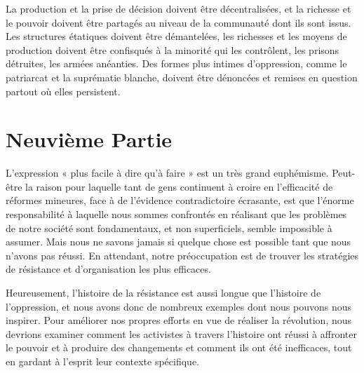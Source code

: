 La production et la prise de décision doivent être décentralisées, et la richesse et le pouvoir doivent être partagés au niveau de la communauté dont ils sont issus. Les structures étatiques doivent être démantelées, les richesses et les moyens de production doivent être confisqués à la minorité qui les contrôlent, les prisons détruites, les armées anéanties. Des formes plus intimes d'oppression, comme le patriarcat et la suprématie blanche, doivent être dénoncées et remises en question partout où elles persistent.

\chapter*{\textbf{Neuvième Partie}}\hypertarget{neuvime-partie}{}\label{neuvime-partie}

L'expression « plus facile à dire qu'à faire » est un très grand euphémisme. Peut-être la raison pour laquelle tant de gens continuent à croire en l'efficacité de réformes mineures, face à de l’évidence contradictoire écrasante, est que l'énorme responsabilité à laquelle nous sommes confrontés en réalisant que les problèmes de notre société sont fondamentaux, et non superficiels, semble impossible à assumer. Mais nous ne savons jamais si quelque chose est possible tant que nous n'avons pas réussi. En attendant, notre préoccupation est de trouver les stratégies de résistance et d'organisation les plus efficaces.

Heureusement, l'histoire de la résistance est aussi longue que l'histoire de l'oppression, et nous avons donc de nombreux exemples dont nous pouvons nous inspirer. Pour améliorer nos propres efforts en vue de réaliser la révolution, nous devrions examiner comment les activistes à travers l'histoire ont réussi à affronter le pouvoir et à produire des changements et comment ils ont été inefficaces, tout en gardant à l'esprit leur contexte spécifique.

